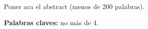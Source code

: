 \section*{\runtitulo}

\noindent Poner aca el abstract (menos de 200 palabras).

\bigskip

\noindent\textbf{Palabras claves:} no más de 4.
